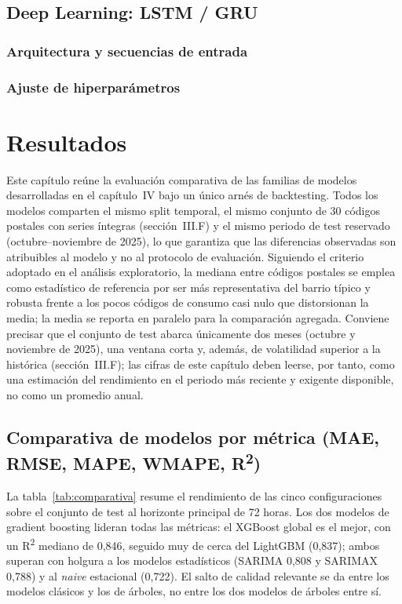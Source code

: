 \documentclass[12pt, a4paper]{article}
\begin{document}
\subsection{Deep Learning: LSTM / GRU}
\subsubsection{Arquitectura y secuencias de entrada}
\subsubsection{Ajuste de hiperparámetros}

\section{Resultados}

Este capítulo reúne la evaluación comparativa de las familias de modelos desarrolladas en el capítulo~IV bajo un único arnés de backtesting. Todos los modelos comparten el mismo split temporal, el mismo conjunto de 30 códigos postales con series íntegras (sección~III.F) y el mismo periodo de test reservado (octubre--noviembre de 2025), lo que garantiza que las diferencias observadas son atribuibles al modelo y no al protocolo de evaluación. Siguiendo el criterio adoptado en el análisis exploratorio, la mediana entre códigos postales se emplea como estadístico de referencia por ser más representativa del barrio típico y robusta frente a los pocos códigos de consumo casi nulo que distorsionan la media; la media se reporta en paralelo para la comparación agregada. Conviene precisar que el conjunto de test abarca únicamente dos meses (octubre y noviembre de 2025), una ventana corta y, además, de volatilidad superior a la histórica (sección~III.F); las cifras de este capítulo deben leerse, por tanto, como una estimación del rendimiento en el periodo más reciente y exigente disponible, no como un promedio anual.

\subsection{Comparativa de modelos por métrica (MAE, RMSE, MAPE, WMAPE, R\textsuperscript{2})}

La tabla~\ref{tab:comparativa} resume el rendimiento de las cinco configuraciones sobre el conjunto de test al horizonte principal de 72 horas. Los dos modelos de gradient boosting lideran todas las métricas: el XGBoost global es el mejor, con un R\textsuperscript{2} mediano de 0,846, seguido muy de cerca del LightGBM (0,837); ambos superan con holgura a los modelos estadísticos (SARIMA 0,808 y SARIMAX 0,788) y al \textit{naive} estacional (0,722). El salto de calidad relevante se da entre los modelos clásicos y los de árboles, no entre los dos modelos de árboles entre sí.
\end{document}

